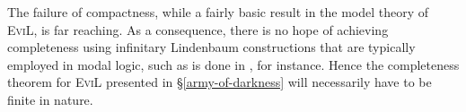 The failure of compactness, while a fairly basic result in the model
theory of \textsc{EviL}, is far reaching.  As a consequence, there is
no hope of achieving completeness using infinitary Lindenbaum
constructions that are typically employed in modal logic, such as is
done in \citep[][chapter 4]{blackburn_modal_2001}, for instance.
Hence the completeness theorem for \textsc{EviL} presented in \S\ref{army-of-darkness}
will necessarily have to be finite in nature.
